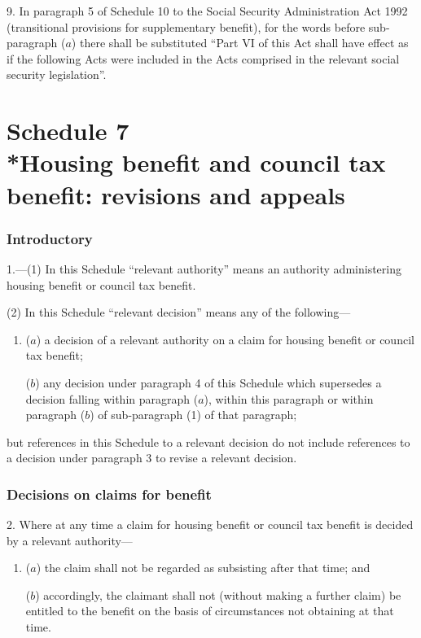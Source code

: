 \documentclass[12pt,a4paper]{article}
\begin{document}
\medskip

9. In paragraph 5 of Schedule 10 to the Social Security Administration Act 1992 (transitional provisions for supplementary benefit), for the words before sub-paragraph ($a$)  there shall be substituted “Part VI of this Act shall have effect as if the following Acts were included in the Acts comprised in the relevant social security legislation”.

\part[Schedule 7 --- Housing benefit and council tax benefit: revisions and appeals]{Schedule 7\\*Housing benefit and council tax benefit: revisions and appeals}

\renewcommand\parthead{--- Schedule 7}

\section*{Introductory}

1.---(1) In this Schedule “relevant authority” means an authority administering housing benefit or council tax benefit.

(2) In this Schedule “relevant decision” means any of the following—
\begin{enumerate}\item[]
($a$) a decision of a relevant authority on a claim for housing benefit or council tax benefit;

($b$) any decision under paragraph 4 of this Schedule which supersedes a decision falling within paragraph ($a$), within this paragraph or within paragraph ($b$)  of sub-paragraph (1)  of that paragraph;
\end{enumerate}
but references in this Schedule to a relevant decision do not include references to a decision under paragraph 3 to revise a relevant decision.

\section*{Decisions on claims for benefit}

2. Where at any time a claim for housing benefit or council tax benefit is decided by a relevant authority—
\begin{enumerate}\item[]
($a$) the claim shall not be regarded as subsisting after that time; and

($b$) accordingly, the claimant shall not (without making a further claim) be entitled to the benefit on the basis of circumstances not obtaining at that time.
\end{enumerate}
\end{document}
